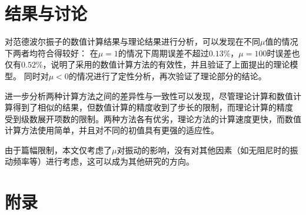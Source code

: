 \documentclass[10.5pt,oneside,a4paper]{article}
\theoremstyle{mystyle}
\begin{document}
\section{结果与讨论}

对范德波尔振子的数值计算结果与理论结果进行分析，可以发现在不同$\mu$值的情况下两者均符合得较好：
在$\mu=1$的情况下周期误差不超过$0.13\%$，$\mu=100$时误差也仅有$0.52\%$，说明了采用的数值计算方法的有效性，并且验证了上面提出的理论模型。
同时对$\mu<0$的情况进行了定性分析，再次验证了理论部分的结论。

进一步分析两种计算方法之间的差异性与一致性可以发现，尽管理论计算和数值计算得到了相似的结果，但数值计算的精度收到了步长的限制，而理论计算的精度
受到级数展开项数的限制。两种方法各有优劣，理论方法的计算速度更快，而数值计算方法使用简单，并且对不同的初值具有更强的适应性。

由于篇幅限制，本文仅考虑了$\mu$对振动的影响，没有对其他因素（如无阻尼时的振动频率等）进行考虑，这可以成为其他研究的方向。

\newpage




\newpage
\section*{附录}
\end{document}
